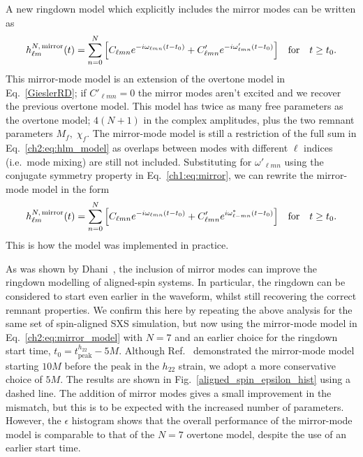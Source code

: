 A new ringdown model which explicitly includes the mirror modes can be written as
\begin{equation}
    h_{\ell m}^{N,\, {\rm mirror}}(t) = \sum_{n=0}^N \qty[ C_{\ell m n} e^{-i \omega_{\ell m n}(t-t_0)} + C'_{\ell m n} e^{-i \omega'_{\ell m n}(t-t_0)} ]\quad \textrm{for} \quad t \geq t_0.
\end{equation}
This mirror-mode model is an extension of the overtone model in Eq.~\ref{GieslerRD};
if $C'_{\ell m n} = 0$ the mirror modes aren't excited and we recover the previous overtone model. 
This model has twice as many free parameters as the overtone model; $4(N+1)$ in the complex amplitudes, plus the two remnant parameters $M_f,\; \chi_f$.
The mirror-mode model is still a restriction of the full sum in Eq.~\ref{ch2:eq:hlm_model} as overlaps between modes with different $\ell$ indices (i.e.\ mode mixing) are still not included.
Substituting for $\omega'_{\ell m n}$ using the conjugate symmetry property in Eq.~\ref{ch1:eq:mirror}, we can rewrite the mirror-mode model in the form
\begin{equation} \label{ch2:eq:mirror_model}
   h_{\ell m}^{N,\, {\rm mirror}}(t) = \sum_{n=0}^N \qty[ C_{\ell m n} e^{-i \omega_{\ell m n}(t-t_0)} + C'_{\ell m n} e^{i \omega^*_{\ell -m n}(t-t_0)} ]\quad \textrm{for} \quad t \geq t_0.
\end{equation}
This is how the model was implemented in practice.

As was shown by Dhani~\cite{Dhani:2020nik}, the inclusion of mirror modes can improve the ringdown modelling of aligned-spin systems. In particular, the ringdown can be considered to start even earlier in the waveform, whilst still recovering the correct remnant properties. We confirm this here by repeating the above analysis for the same set of spin-aligned SXS simulation, but now using the mirror-mode model in Eq.~\ref{ch2:eq:mirror_model} with $N=7$ and an earlier choice for the ringdown start time, $t_0 = t_{\mathrm{peak}}^{h_{22}} - 5M$.
Although Ref.~\cite{Dhani:2020nik} demonstrated the mirror-mode model starting $10M$ before the peak in the $h_{22}$ strain, we adopt a more conservative choice of $5M$.
The results are shown in Fig.~\ref{aligned_spin_epsilon_hist} using a dashed line. 
The addition of mirror modes gives a small improvement in the mismatch, but this is to be expected with the increased number of parameters.
However, the $\epsilon$ histogram shows that the overall performance of the mirror-mode model is comparable to that of the $N=7$ overtone model, despite the use of an earlier start time.


